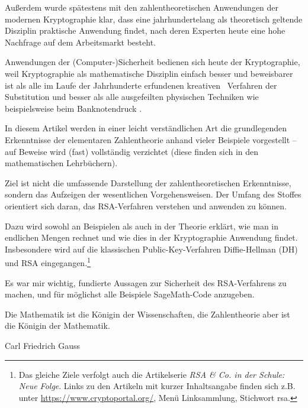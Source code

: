 \begin{refsegment}
Außerdem wurde spätestens mit den zahlentheoretischen Anwendungen der
modernen Kryptographie klar, dass eine jahrhundertelang als theoretisch
geltende Disziplin praktische Anwendung findet, nach deren Experten heute
eine hohe Nachfrage auf dem Arbeitsmarkt besteht.

Anwendungen der (Computer-)Sicherheit bedienen sich heute der Kryptographie,
weil Kryptographie als mathematische Disziplin einfach besser und
beweisbarer ist als alle im Laufe der Jahrhunderte erfundenen \glqq kreativen\grqq~
Verfahren der Substitution und besser als alle ausgefeilten physischen
Techniken wie beispielsweise beim Banknotendruck \cite[S. 4]{Beutelspacher1996}.

In diesem Artikel werden in einer leicht verständlichen Art die
grundlegenden Erkenntnisse der elementaren Zahlentheorie anhand vieler
Beispiele vorgestellt -- auf Beweise wird (fast) vollständig verzichtet
(diese finden sich in den mathematischen Lehrbüchern).

Ziel ist nicht die umfassende Darstellung der zahlentheoretischen Erkenntnisse,
sondern das Aufzeigen der wesentlichen Vorgehensweisen. Der Umfang des Stoffes
orientiert sich daran, das RSA-Verfahren verstehen und anwenden
zu können.

Dazu wird sowohl an Beispielen als auch in der Theorie erklärt, wie man in
endlichen Mengen rechnet und wie dies in der Kryptographie Anwendung findet.
Insbesondere wird auf die klassischen Public-Key-Verfahren Diffie-Hellman
 (DH) und RSA eingegangen.\footnote{%
  Das gleiche Ziele verfolgt auch die Artikelserie
  {\em RSA \& Co. in der Schule: Neue Folge}.
  Links zu den Artikeln mit kurzer Inhaltsangabe finden sich z.B. unter
  \url{https://www.cryptoportal.org/}, Menü \glqq Linksammlung\grqq,
  Stichwort \glqq rsa\grqq.
}

Es war mir wichtig, fundierte Aussagen zur Sicherheit des RSA-Verfahrens zu
machen, und für möglichst alle Beispiele SageMath-Code anzugeben.


\begin{ctsquote}
Die Mathematik ist die Königin der Wissenschaften, die Zahlentheorie aber
ist die Königin der Mathematik.
\caption{Carl Friedrich Gauss}
\end{ctsquote}


\end{refsegment}
